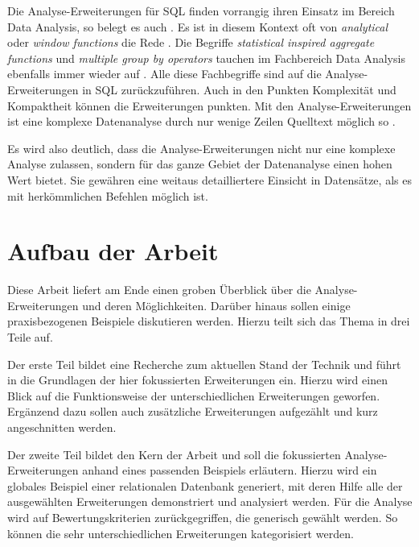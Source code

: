 Die Analyse-Erweiterungen für SQL finden vorrangig ihren Einsatz im Bereich Data
Analysis, so belegt es auch \citet[Kapitel 3]{FOTACHE2015243}. Es ist in diesem
Kontext oft von \textit{analytical} oder \textit{window functions} die Rede
\citep[Kapitel 3]{FOTACHE2015243}. Die Begriffe \textit{statistical inspired
aggregate functions} und \textit{multiple group by operators} tauchen im Fachbereich
Data Analysis ebenfalls immer wieder auf \citep[Kapitel 4.3]{FOTACHE2015243}.
Alle diese Fachbegriffe sind auf die Analyse-Erweiterungen in SQL zurückzuführen.
Auch in den Punkten Komplexität und Kompaktheit können die Erweiterungen punkten.
Mit den Analyse-Erweiterungen ist eine komplexe Datenanalyse durch nur wenige
Zeilen Quelltext möglich so \citet[Abstract]{Maue2022}.

Es wird also deutlich, dass die Analyse-Erweiterungen nicht nur eine komplexe Analyse
zulassen, sondern für das ganze Gebiet der Datenanalyse einen hohen Wert bietet.
Sie gewähren eine weitaus detailliertere Einsicht in Datensätze, als es mit
herkömmlichen Befehlen möglich ist.


\section{Aufbau der Arbeit}
\label{sec:aufbau_der_arbeit} Diese Arbeit liefert am Ende einen groben Überblick
über die Analyse-Erweiterungen und deren Möglichkeiten. Darüber hinaus sollen
einige praxisbezogenen Beispiele diskutieren werden. Hierzu teilt sich das Thema
in drei Teile auf.

Der erste Teil bildet eine Recherche zum aktuellen Stand der Technik und führt in
die Grundlagen der hier fokussierten Erweiterungen ein. Hierzu wird einen Blick
auf die Funktionsweise der unterschiedlichen Erweiterungen geworfen. Ergänzend dazu
sollen auch zusätzliche Erweiterungen aufgezählt und kurz angeschnitten werden.

Der zweite Teil bildet den Kern der Arbeit und soll die fokussierten Analyse-Erweiterungen
anhand eines passenden Beispiels erläutern. Hierzu wird ein globales Beispiel
einer relationalen Datenbank generiert, mit deren Hilfe alle der ausgewählten Erweiterungen
demonstriert und analysiert werden. Für die Analyse wird auf Bewertungskriterien
zurückgegriffen, die generisch gewählt werden. So können die sehr
unterschiedlichen Erweiterungen kategorisiert werden.

